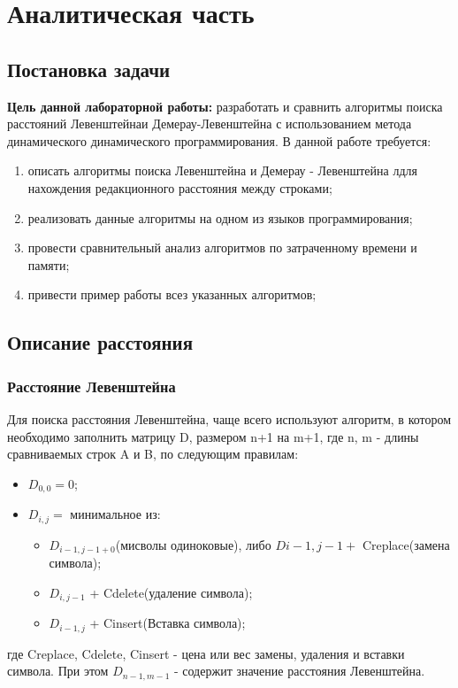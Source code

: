 \documentclass[a4paper]{article}
\begin{document}
	\section{Аналитическая часть}
	\subsection{Постановка задачи}
	{\bf Цель данной лабораторной работы:} разработать и сравнить алгоритмы поиска расстояний Левенштейнаи Демерау-Левенштейна с использованием метода динамического динамического программирования.
	\newline
	В данной работе требуется:
	\begin{enumerate}
		\item описать алгоритмы поиска Левенштейна и Демерау - Левенштейна лдля нахождения редакционного расстояния между строками;
		\item реализовать данные алгоритмы на одном из языков программирования;
		\item провести сравнительный анализ алгоритмов по затраченному времени и памяти;
		\item привести пример работы всез указанных алгоритмов;
	\end{enumerate}
	\subsection{Описание расстояния}
	\subsubsection{Расстояние Левенштейна} Для поиска расстояния Левенштейна, чаще всего используют алгоритм, в котором необходимо заполнить матрицу D, размером n+1 на m+1, где n, m - длины сравниваемых строк A и B, по следующим правилам:
	\begin{itemize}
		\item $D_{0,0} = 0$;
		\item $D_{i,j} = $ минимальное из:
		\begin{itemize}
			\item $D_{i-1, j-1+0}$(мисволы одиноковые), либо $D{i-1, j-1} + $ Creplace(замена символа);
			\item $D_{i, j-1}$ + Cdelete(удаление символа);
			\item $D_{i-1, j}$ + Cinsert(Вставка символа);
		\end{itemize}
	\end{itemize}
	где Creplace, Cdelete, Cinsert - цена или вес замены, удаления и вставки символа. При этом $D_{n-1, m-1}$ - содержит значение расстояния Левенштейна.
	
\end{document}
